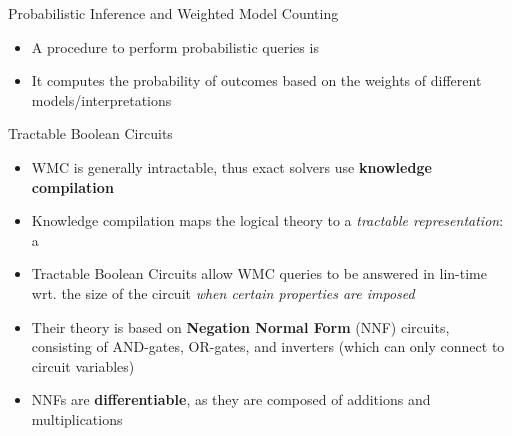 \documentclass[10pt, aspectratio=169]{beamer}
\begin{document}
\begin{frame}{Probabilistic Inference and Weighted Model Counting}
    \begin{itemize}
        \setlength{\itemsep}{13pt}
        \item A procedure to perform probabilistic queries is 
        \item It computes the probability of outcomes based on the weights of different models/interpretations
    \end{itemize}
\end{frame}

\begin{frame}{Tractable Boolean Circuits}
    \begin{itemize}
        \setlength{\itemsep}{12pt}
        \item WMC is generally intractable, thus exact solvers use \textbf{knowledge compilation}
        \item Knowledge compilation maps the logical theory to a \textit{tractable representation}: a 
        \item \textcolor{umBlueLighter}{Tractable Boolean Circuits} allow WMC queries to be answered in lin-time wrt. the size of the circuit \textit{when certain properties are imposed}
        \item Their theory is based on \textbf{Negation Normal Form} (NNF) circuits, consisting of AND-gates, OR-gates, and inverters (which can only connect to circuit variables)
        \item NNFs are \textbf{differentiable}, as they are composed of additions and multiplications
    \end{itemize}
\end{frame}
\end{document}
